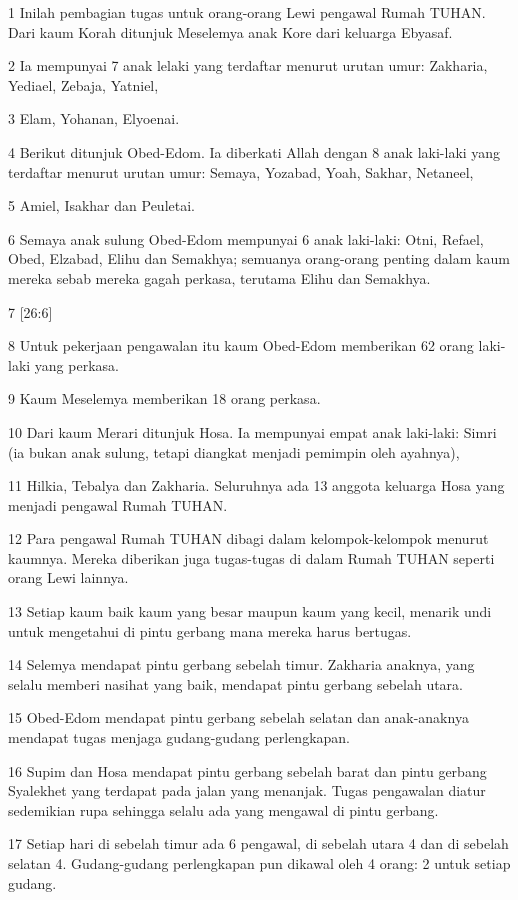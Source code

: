 \par 1 Inilah pembagian tugas untuk orang-orang Lewi pengawal Rumah TUHAN. Dari kaum Korah ditunjuk Meselemya anak Kore dari keluarga Ebyasaf.
\par 2 Ia mempunyai 7 anak lelaki yang terdaftar menurut urutan umur: Zakharia, Yediael, Zebaja, Yatniel,
\par 3 Elam, Yohanan, Elyoenai.
\par 4 Berikut ditunjuk Obed-Edom. Ia diberkati Allah dengan 8 anak laki-laki yang terdaftar menurut urutan umur: Semaya, Yozabad, Yoah, Sakhar, Netaneel,
\par 5 Amiel, Isakhar dan Peuletai.
\par 6 Semaya anak sulung Obed-Edom mempunyai 6 anak laki-laki: Otni, Refael, Obed, Elzabad, Elihu dan Semakhya; semuanya orang-orang penting dalam kaum mereka sebab mereka gagah perkasa, terutama Elihu dan Semakhya.
\par 7 [26:6]
\par 8 Untuk pekerjaan pengawalan itu kaum Obed-Edom memberikan 62 orang laki-laki yang perkasa.
\par 9 Kaum Meselemya memberikan 18 orang perkasa.
\par 10 Dari kaum Merari ditunjuk Hosa. Ia mempunyai empat anak laki-laki: Simri (ia bukan anak sulung, tetapi diangkat menjadi pemimpin oleh ayahnya),
\par 11 Hilkia, Tebalya dan Zakharia. Seluruhnya ada 13 anggota keluarga Hosa yang menjadi pengawal Rumah TUHAN.
\par 12 Para pengawal Rumah TUHAN dibagi dalam kelompok-kelompok menurut kaumnya. Mereka diberikan juga tugas-tugas di dalam Rumah TUHAN seperti orang Lewi lainnya.
\par 13 Setiap kaum baik kaum yang besar maupun kaum yang kecil, menarik undi untuk mengetahui di pintu gerbang mana mereka harus bertugas.
\par 14 Selemya mendapat pintu gerbang sebelah timur. Zakharia anaknya, yang selalu memberi nasihat yang baik, mendapat pintu gerbang sebelah utara.
\par 15 Obed-Edom mendapat pintu gerbang sebelah selatan dan anak-anaknya mendapat tugas menjaga gudang-gudang perlengkapan.
\par 16 Supim dan Hosa mendapat pintu gerbang sebelah barat dan pintu gerbang Syalekhet yang terdapat pada jalan yang menanjak. Tugas pengawalan diatur sedemikian rupa sehingga selalu ada yang mengawal di pintu gerbang.
\par 17 Setiap hari di sebelah timur ada 6 pengawal, di sebelah utara 4 dan di sebelah selatan 4. Gudang-gudang perlengkapan pun dikawal oleh 4 orang: 2 untuk setiap gudang.
